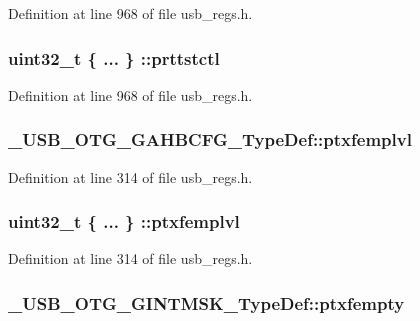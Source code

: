 Definition at line 968 of file usb\-\_\-regs.\-h.

\hypertarget{group___u_s_b___o_t_g___d_r_i_v_e_r_ga8d5ade56bf69632b2b2179aac37d8414}{
\subsubsection[{prttstctl}]{\setlength{\rightskip}{0pt plus 5cm}uint32\-\_\-t \{ ... \} \-::prttstctl}}\label{group___u_s_b___o_t_g___d_r_i_v_e_r_ga8d5ade56bf69632b2b2179aac37d8414}


Definition at line 968 of file usb\-\_\-regs.\-h.

\hypertarget{group___u_s_b___o_t_g___d_r_i_v_e_r_ga8aef75b0d6a052f8e4e305e99f9dca16}{
\subsubsection[{ptxfemplvl}]{ \-\_\-\-U\-S\-B\-\_\-\-O\-T\-G\-\_\-\-G\-A\-H\-B\-C\-F\-G\-\_\-\-Type\-Def\-::ptxfemplvl}}\label{group___u_s_b___o_t_g___d_r_i_v_e_r_ga8aef75b0d6a052f8e4e305e99f9dca16}


Definition at line 314 of file usb\-\_\-regs.\-h.

\hypertarget{group___u_s_b___o_t_g___d_r_i_v_e_r_gabc135e456182708cc5f91665661a3fcb}{
\subsubsection[{ptxfemplvl}]{\setlength{\rightskip}{0pt plus 5cm}uint32\-\_\-t \{ ... \} \-::ptxfemplvl}}\label{group___u_s_b___o_t_g___d_r_i_v_e_r_gabc135e456182708cc5f91665661a3fcb}


Definition at line 314 of file usb\-\_\-regs.\-h.

\hypertarget{group___u_s_b___o_t_g___d_r_i_v_e_r_gaa333b78e682c36bf18392c4b0d5a9c6f}{
\subsubsection[{ptxfempty}]{ \-\_\-\-U\-S\-B\-\_\-\-O\-T\-G\-\_\-\-G\-I\-N\-T\-M\-S\-K\-\_\-\-Type\-Def\-::ptxfempty}}\label{group___u_s_b___o_t_g___d_r_i_v_e_r_gaa333b78e682c36bf18392c4b0d5a9c6f}


